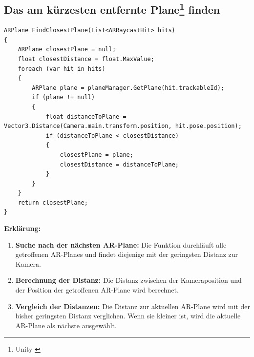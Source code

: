 \subsection*{Das am kürzesten entfernte Plane\footnote{Unity \cite{Plane}} finden}
\begin{lstlisting}[style=csharp, caption={}, label=code:findclosestplane]
ARPlane FindClosestPlane(List<ARRaycastHit> hits)
{
    ARPlane closestPlane = null;
    float closestDistance = float.MaxValue;
    foreach (var hit in hits)
    {
        ARPlane plane = planeManager.GetPlane(hit.trackableId);
        if (plane != null)
        {
            float distanceToPlane = Vector3.Distance(Camera.main.transform.position, hit.pose.position);
            if (distanceToPlane < closestDistance)
            {
                closestPlane = plane;
                closestDistance = distanceToPlane;
            }
        }
    }
    return closestPlane;
}
\end{lstlisting}

\textbf{Erklärung:}
\begin{enumerate}
    \item \textbf{Suche nach der nächsten AR-Plane:} Die Funktion durchläuft alle getroffenen AR-Planes und findet diejenige mit der geringsten Distanz zur Kamera.
    \item \textbf{Berechnung der Distanz:} Die Distanz zwischen der Kameraposition und der Position der getroffenen AR-Plane wird berechnet.
    \item \textbf{Vergleich der Distanzen:} Die Distanz zur aktuellen AR-Plane wird mit der bisher geringsten Distanz verglichen. Wenn sie kleiner ist, wird die aktuelle AR-Plane als nächste ausgewählt.\\
\end{enumerate}

